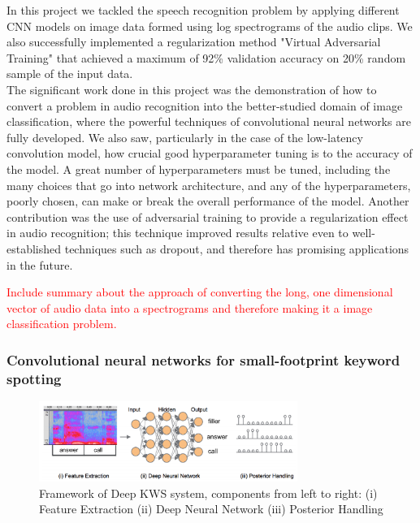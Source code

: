 \documentclass{article}
\theoremstyle{definition}
\theoremstyle{remark}
\begin{document}
In this project we tackled the speech recognition problem by applying different CNN models on image data formed using log spectrograms of the audio clips. We also successfully implemented a regularization method "Virtual Adversarial Training" that achieved a maximum of 92\% validation accuracy on 20\% random sample of
the input data.\\
The significant work done in this project was the demonstration of how to convert a problem in audio recognition into the better-studied domain of image classification, where the powerful techniques of convolutional neural networks are fully developed.
We also saw, particularly in the case of the low-latency convolution model, how crucial good hyperparameter tuning is to the accuracy of the model. A great number of hyperparameters must be tuned, including the many choices that go into network architecture, and any of the hyperparameters, poorly chosen, can make or break the overall performance of the model. Another contribution was the use of adversarial training to provide a regularization effect in audio recognition; this technique improved results relative even to well-established techniques such as dropout, and therefore has promising applications in the future.







\textcolor{red}{Include summary about the approach of converting the long, one dimensional vector of audio data into a spectrograms and therefore making it a image classification problem.}

\subsubsection{Convolutional neural networks for small-footprint keyword spotting}

\begin{figure}[h]
    \centering
    \includegraphics[width=0.75\textwidth]{img/papers/cnns_for_keyword_spotting/deep_kws_system_framework.png}
    \caption{Framework of Deep KWS system, components from
left to right: (i) Feature Extraction (ii) Deep Neural Network
(iii) Posterior Handling}
    \label{fig:deep_kws_system_frameworkl}
\end{figure}
\end{document}

